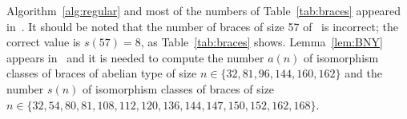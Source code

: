 Algorithm~\ref{alg:regular} and most of the numbers of Table~\ref{tab:braces} appeared in~\cite{MR3647970}. 
It should be noted that the number of braces of size 57 of~\cite{MR3647970} is incorrect;
the correct value is $s(57)=8$, as Table~\ref{tab:braces} shows. 
Lemma~\ref{lem:BNY} appears in~\cite{MR4113853} and it is needed to compute the number 
$a(n)$ of isomorphism classes of braces of abelian type of size $n\in\{32,81,96,144,160,162\}$ and 
the number 
$s(n)$ of isomorphism classes of braces of size 
$n\in\{32,54,80,81,108,112,120,136,144,147,150,152,162,168\}$. 


